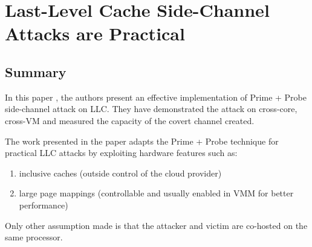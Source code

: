 \documentclass[a4paper,12pt, final]{report}
\begin{document}





\section{Last-Level Cache Side-Channel Attacks are Practical}

\subsection{Summary}

\hspace{5pt} In this paper \cite{prime_probe_llc}, the authors present an effective implementation of Prime + Probe side-channel attack on LLC. They have demonstrated the attack on cross-core, cross-VM and measured the capacity of the covert channel created.

The work presented in the paper adapts the Prime + Probe technique for practical LLC attacks by exploiting hardware features such as:

\begin{enumerate}
    \item inclusive caches (outside control of the cloud provider)
    \item large page mappings (controllable and usually enabled in VMM for better performance)
\end{enumerate}

Only other assumption made is that the attacker and victim are co-hosted on the same processor.
\end{document}

